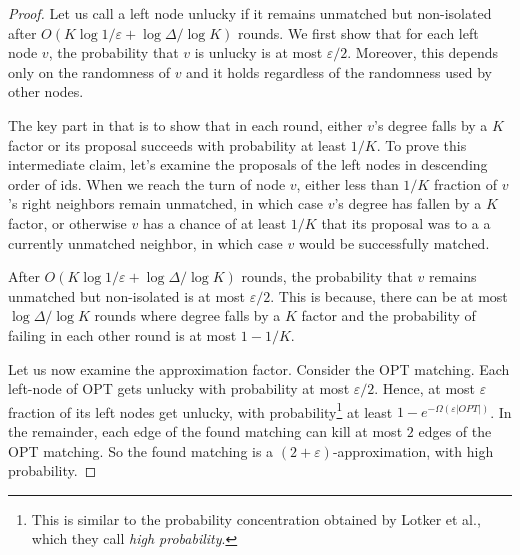 \documentclass[11pt]{article}
\newcommand{\eps}{\varepsilon}
\begin{document}
\begin{proof} Let us call a left node unlucky if it remains unmatched but non-isolated after $O(K\log 1/\eps+ \log \Delta/\log K)$ rounds. We first show that for each left node $v$, the probability that $v$ is unlucky is at most $\eps/2$. Moreover, this depends only on the randomness of $v$ and it holds regardless of the randomness used by other nodes.

The key part in that is to show that in each round, either $v$'s degree falls by a $K$ factor or its proposal succeeds with probability at least $1/K$. To prove this intermediate claim, let's examine the proposals of the left nodes in descending order of ids. When we reach the turn of node $v$, either less than $1/K$ fraction of $v$'s right neighbors remain unmatched, in which case $v$'s degree has fallen by a $K$ factor, or otherwise $v$ has a chance of at least $1/K$ that its proposal was to a a currently unmatched neighbor, in which case $v$ would be successfully matched.

After $O(K\log 1/\eps+ \log \Delta/\log K)$ rounds, the probability that $v$ remains unmatched but non-isolated is at most $\eps/2$. This is because, there can be at most  $\log \Delta/\log K$ rounds where degree falls by a $K$ factor and the probability of failing in each other round is at most $1-1/K$.

Let us now examine the approximation factor. Consider the OPT matching. Each left-node of OPT gets unlucky with probability at most $\eps/2$. Hence, at most $\eps$ fraction of its left nodes get unlucky, with probability\footnote{This is similar to the probability concentration obtained by Lotker et al.\cite{lotkerMatchingImproved}, which they call \emph{high probability}.} at least $1-e^{-\Omega(\eps |OPT|)}$. In the remainder, each edge of the found matching can kill at most $2$ edges of the OPT matching. So the found matching is a $(2+\eps)$-approximation, with high probability. 
\end{proof}
\end{document}
